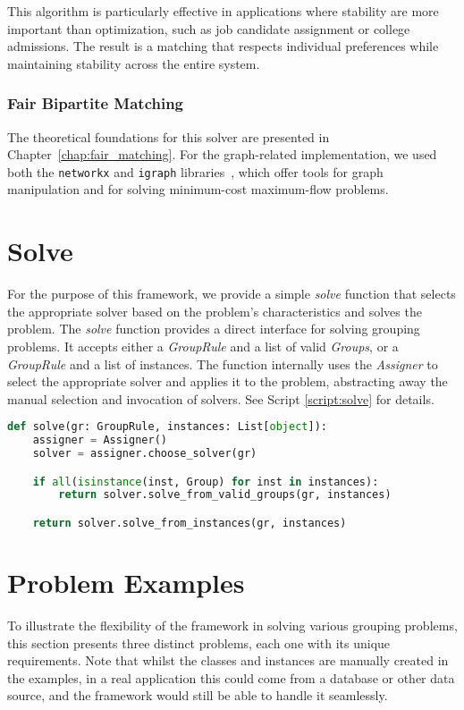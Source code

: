     This algorithm is particularly effective in applications where stability are more important than optimization, such as job candidate assignment or college admissions. The result is a matching that respects individual preferences while maintaining stability across the entire system.

    \subsubsection{Fair Bipartite Matching}

    The theoretical foundations for this solver are presented in Chapter~\ref{chap:fair_matching}.  
    For the graph-related implementation, we used both the \texttt{networkx} and \texttt{igraph} libraries~\cite{hagberg2008exploring, igraph}, which offer tools for graph manipulation and for solving minimum-cost maximum-flow problems.


    \section{Solve}
    For the purpose of this framework, we provide a simple \textit{solve} function that selects the appropriate solver based on the problem's characteristics and solves the problem.
    The \textit{solve} function provides a direct interface for solving grouping problems.
    It accepts either a \textit{GroupRule} and a list of valid \textit{Groups}, or a \textit{GroupRule} and a list of instances.
    The function internally uses the \textit{Assigner} to select the appropriate solver and applies it to the problem, abstracting away the manual selection and invocation of solvers.
    See Script \ref{script:solve} for details.

    \begin{lstlisting}[language=Python, caption={Solve.}, label={script:solve}]
def solve(gr: GroupRule, instances: List[object]):
    assigner = Assigner()
    solver = assigner.choose_solver(gr)

    if all(isinstance(inst, Group) for inst in instances):
        return solver.solve_from_valid_groups(gr, instances)

    return solver.solve_from_instances(gr, instances)
\end{lstlisting}

    \section{Problem Examples} \label{sec:examples}
To illustrate the flexibility of the framework in solving various grouping problems, this section presents three distinct problems, each one with its unique requirements.
Note that whilst the classes and instances are manually created in the examples, in a real application this could come from a database or other data source, and the framework would still be able to handle it seamlessly.


